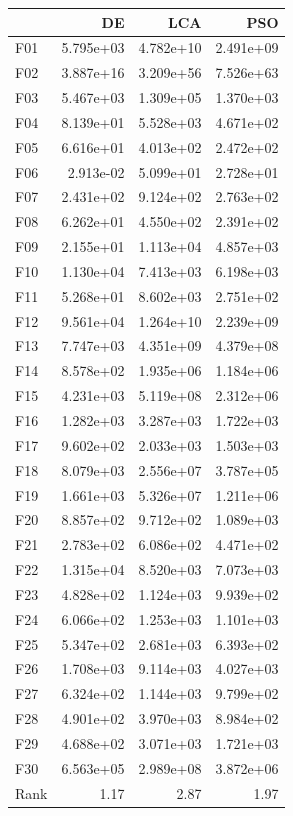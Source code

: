 \begin{tabular}{lrrr}
\toprule
 & DE & LCA & PSO \\
\midrule
F01 & 5.795e+03 & 4.782e+10 & 2.491e+09 \\
F02 & 3.887e+16 & 3.209e+56 & 7.526e+63 \\
F03 & 5.467e+03 & 1.309e+05 & 1.370e+03 \\
F04 & 8.139e+01 & 5.528e+03 & 4.671e+02 \\
F05 & 6.616e+01 & 4.013e+02 & 2.472e+02 \\
F06 & 2.913e-02 & 5.099e+01 & 2.728e+01 \\
F07 & 2.431e+02 & 9.124e+02 & 2.763e+02 \\
F08 & 6.262e+01 & 4.550e+02 & 2.391e+02 \\
F09 & 2.155e+01 & 1.113e+04 & 4.857e+03 \\
F10 & 1.130e+04 & 7.413e+03 & 6.198e+03 \\
F11 & 5.268e+01 & 8.602e+03 & 2.751e+02 \\
F12 & 9.561e+04 & 1.264e+10 & 2.239e+09 \\
F13 & 7.747e+03 & 4.351e+09 & 4.379e+08 \\
F14 & 8.578e+02 & 1.935e+06 & 1.184e+06 \\
F15 & 4.231e+03 & 5.119e+08 & 2.312e+06 \\
F16 & 1.282e+03 & 3.287e+03 & 1.722e+03 \\
F17 & 9.602e+02 & 2.033e+03 & 1.503e+03 \\
F18 & 8.079e+03 & 2.556e+07 & 3.787e+05 \\
F19 & 1.661e+03 & 5.326e+07 & 1.211e+06 \\
F20 & 8.857e+02 & 9.712e+02 & 1.089e+03 \\
F21 & 2.783e+02 & 6.086e+02 & 4.471e+02 \\
F22 & 1.315e+04 & 8.520e+03 & 7.073e+03 \\
F23 & 4.828e+02 & 1.124e+03 & 9.939e+02 \\
F24 & 6.066e+02 & 1.253e+03 & 1.101e+03 \\
F25 & 5.347e+02 & 2.681e+03 & 6.393e+02 \\
F26 & 1.708e+03 & 9.114e+03 & 4.027e+03 \\
F27 & 6.324e+02 & 1.144e+03 & 9.799e+02 \\
F28 & 4.901e+02 & 3.970e+03 & 8.984e+02 \\
F29 & 4.688e+02 & 3.071e+03 & 1.721e+03 \\
F30 & 6.563e+05 & 2.989e+08 & 3.872e+06 \\
\midrule
Rank & 1.17 & 2.87 & 1.97 \\
\bottomrule
\end{tabular}